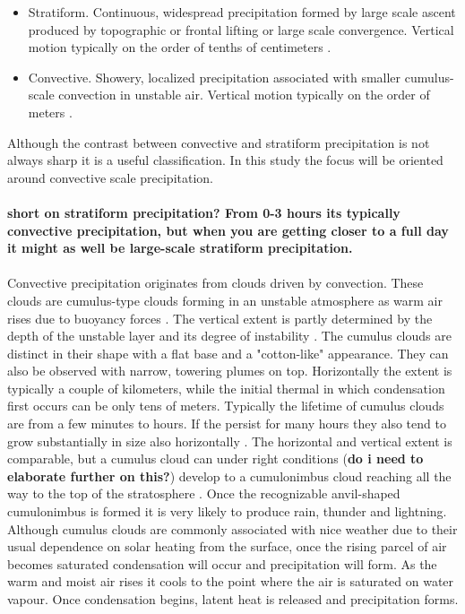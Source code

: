 \begin{itemize}
    \item Stratiform. Continuous, widespread precipitation formed by large scale ascent produced by topographic or frontal lifting or large scale convergence. Vertical motion typically on the order of tenths of centimeters \cite{rogers}. 
    \item Convective. Showery, localized precipitation associated with smaller cumulus-scale convection in unstable air. Vertical motion typically on the order of meters \cite{rogers}.
\end{itemize} 


Although the contrast between convective and stratiform precipitation is not always sharp it is a useful classification. In this study the focus will be oriented around convective scale precipitation.    
\\
\\
\textbf{short on stratiform precipitation? From 0-3 hours its typically convective precipitation, but when you are getting closer to a full day it might as well be large-scale stratiform precipitation.}
\\
\\
Convective precipitation originates from clouds driven by convection. These clouds are cumulus-type clouds forming in an unstable atmosphere as warm air rises due to buoyancy forces \cite{Ahrens}. The vertical extent is partly determined by the depth of the unstable layer and its degree of instability \cite{rogers}. The cumulus clouds are distinct in their shape with a flat base and a "cotton-like" appearance. They can also be observed with narrow, towering plumes on top. Horizontally the extent is typically a couple of kilometers, while the initial thermal in which condensation first occurs can be only tens of meters. Typically the lifetime of cumulus clouds are from a few minutes to hours. If the persist for many hours they also tend to grow substantially in size also horizontally \cite{rogers}. The horizontal and vertical extent is comparable, but a cumulus cloud can under right conditions (\textbf{do i need to elaborate further on this?}) develop to a cumulonimbus cloud reaching all the way to the top of the stratosphere \cite{rogers}. Once the recognizable anvil-shaped cumulonimbus is formed it is very likely to produce rain, thunder and lightning. Although cumulus clouds are commonly associated with nice weather due to their usual dependence on solar heating from the surface, once the rising parcel of air becomes saturated condensation will occur and precipitation will form. As the warm and moist air rises it cools to the point where the air is saturated on water vapour. Once condensation begins, latent heat is released and precipitation forms.


